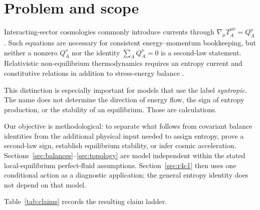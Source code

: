 \documentclass[aps,prd,reprint,superscriptaddress,nofootinbib,floatfix]{revtex4-2}
\begin{document}
\maketitle

\section{Problem and scope}
\label{sec:scope}

Interacting-sector cosmologies commonly introduce currents through
\(\nabla_\mu T_A^{\mu\nu}=Q_A^\nu\).  Such equations are necessary for
consistent energy--momentum bookkeeping, but neither a nonzero \(Q_A^\nu\) nor
the identity \(\sum_AQ_A^\nu=0\) is a second-law statement.  Relativistic
non-equilibrium thermodynamics requires an entropy current and constitutive
relations in addition to stress-energy balance
\cite{israel_stewart,calvao_lima_waga,iosifidis2024}.

This distinction is especially important for models that use the label
\emph{syntropic}.  The name does not determine the direction of energy flow,
the sign of entropy production, or the stability of an equilibrium.  Those
are calculations.

Our objective is methodological: to separate what follows from covariant
balance identities from the additional physical input needed to assign
entropy, prove a second-law sign, establish equilibrium stability, or infer
cosmic acceleration.  Sections~\ref{sec:balances}--\ref{sec:topology} are
model independent within the stated local-equilibrium perfect-fluid
assumptions.  Section~\ref{sec:r4c1} then uses one conditional action as a
diagnostic application; the general entropy identity does not depend on that
model.

Table~\ref{tab:claims} records the resulting claim ladder.
\end{document}
